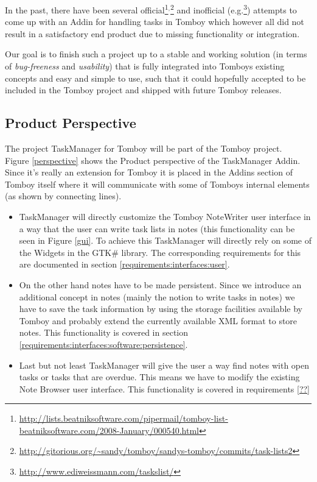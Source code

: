 
\label{integration}
In the past, there have been several official\footnote{\url{http://lists.beatniksoftware.com/pipermail/tomboy-list-beatniksoftware.com/2008-January/000540.html}}$^,$\footnote{\url{http://gitorious.org/~sandy/tomboy/sandys-tomboy/commits/task-lists2}} and inofficial (e.g.\footnote{\url{http://www.ediweissmann.com/taskslist/}}) attempts to come up with an Addin for handling tasks in Tomboy which however all did not result in a satisfactory end product due to missing functionality or integration.

Our goal is to finish such a project up to a stable and working solution (in terms of \textit{bug-freeness} and \textit{usability}) that is fully integrated into Tomboys existing concepts and easy and simple to use, such that it could hopefully accepted to be included in the Tomboy project and shipped with future Tomboy releases.

\subsection{Product Perspective}
\label{description:perspective}
  The project TaskManager for Tomboy will be part of the Tomboy project.\\
  Figure \ref{perspective} shows the Product perspective of the TaskManager Addin. Since it's really an extension for Tomboy it is placed in
  the Addins section of Tomboy itself where it will communicate with some of Tomboys internal elements (as shown by connecting lines).
  \begin{itemize}
    \item TaskManager will directly customize the Tomboy NoteWriter user interface in a way that the user can write task lists in notes 
	(this functionality can be seen in Figure \ref{gui}. To achieve this TaskManager will  directly rely on some of the 
	Widgets in the GTK\# library. The corresponding requirements for this are documented in section \ref{requirements:interfaces:user}.
    \item On the other hand notes have to be made persistent. Since we introduce an additional concept in notes (mainly
    the notion to write tasks in notes) we have to save the task information by using the storage facilities available by Tomboy and probably extend
    the currently available XML format to store notes. This functionality is covered in section \ref{requirements:interfaces:software:persistence}.
    \item Last but not least TaskManager will give the user a way find notes with open tasks or tasks that are overdue. This means we have to modify
    the existing Note Browser user interface. This functionality is covered in requirements \ref{??}%
  \end{itemize}


